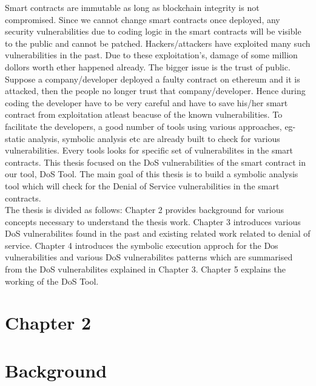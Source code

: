 \documentclass{article}
\begin{document}
Smart contracts are immutable as long as blockchain integrity is not compromised. Since we cannot change smart contracts once deployed, any security vulnerabilities due to coding logic in the smart contracts will be visible to the public and cannot be patched. Hackers/attackers have exploited many such vulnerabilities in the past. Due to these exploitation's, damage of some million dollors worth ether happened already. The bigger issue is the trust of public. Suppose a company/developer deployed a faulty contract on ethereum and it is attacked, then the people no longer trust that company/developer. Hence during coding the developer have to be very careful and have to save his/her smart contract from exploitation atleast beacuse of the known vulnerabilities. To facilitate the developers, a good number of tools using various approaches, eg-static analysis, symbolic analysis etc are already built to check for various vulnerabilities. Every tools looks for specific set of vulnerabilites in the smart contracts. This thesis focused on the DoS vulnerabilities of the smart contract in our tool, DoS Tool. The main goal of this thesis is to build a symbolic analysis tool which will check for the Denial of Service vulnerabilities in the smart contracts.\\
The thesis is divided as follows: Chapter 2 provides background for various concepts necessary to understand the thesis work. Chapter 3 introduces various DoS vulnerabilites found in the past and existing related work related to denial of service. Chapter 4 introduces the symbolic execution approch for the Dos vulnerabilities and various DoS vulnerabilites patterns which are summarised from the DoS vulnerabilites explained in Chapter 3. Chapter 5 explains the working of the DoS Tool.
\newpage
\section*{Chapter 2}
\section*{Background}
\end{document}
